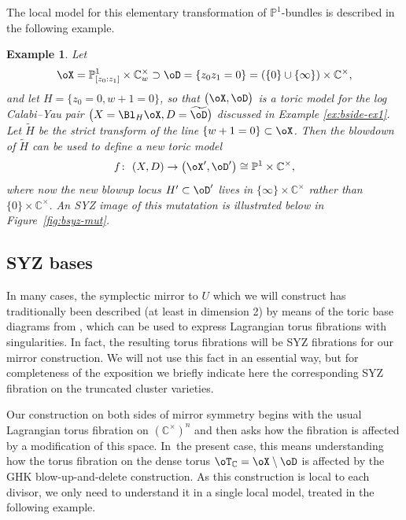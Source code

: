 \documentclass[pdftex]{sigma}%
\numberwithin{equation}{section}
\newtheorem{Example}[Theorem]{Example}
\def\CC{\mathbb{C}}
\def\PP{\mathbb{P}}
\begin{document}
The local model for this elementary transformation of $\PP^1$-bundles is described in the following example.
\begin{Example}\label{ex:elem-mut} Let
\[\oX = \PP^1_{[z_0:z_1]}\times \CC^\times_w\supset\oD = \{z_0z_1=0\}= (\{0\}\cup\{\infty\})\times \CC^\times,\]
and let $H = \{z_0=0, w + 1=0\}$, so that $\bigl(\oX,\oD\bigr)$ is a toric model for the log Calabi--Yau pair $\bigl(X = \Bl_H\oX, D=\widetilde{\oD}\bigr)$ discussed in Example \ref{ex:bside-ex1}. Let $\widetilde{H}$ be the strict transform of the line $\{w+1=0\}\subset \oX$. Then the blowdown of $\widetilde{H}$ can be used to define a new toric model
\[
f\colon\ (X,D)\to\big(\oX',\oD'\big)\cong \PP^1\times \CC^\times,
\]
where now the new blowup locus $H'\subset \oD'$ lives in $\{\infty\}\times \CC^\times$ rather than $\{0\}\times \CC^\times$. An SYZ image of this mutatation is illustrated below in Figure~\ref{fig:bsyz-mut}.
\end{Example}

\subsection{SYZ bases}\label{sec:bsyz}
In many cases, the symplectic mirror to $U$ which we will construct has traditionally been des\-cribed (at least in dimension 2)
by means of the toric base diagrams from \cite{Sym}, which can be used to express Lagrangian torus fibrations with singularities. In fact, the resulting torus fibrations will be SYZ fibrations for our mirror construction. We will not use this fact in an essential way, but for completeness of the exposition we briefly indicate here the corresponding SYZ fibration on the truncated cluster varieties.

Our construction on both sides of mirror symmetry begins with the usual Lagrangian torus fibration on $(\CC^\times)^n$ and then asks how the fibration is affected by a modification of this space. In~the present case, this means understanding how the torus fibration on the dense torus $\oT_\CC=\oX\setminus \oD$ is affected by the GHK blow-up-and-delete construction. As this construction is local to each divisor, we only need to understand it in a single local model, treated in the following example.
\end{document}

